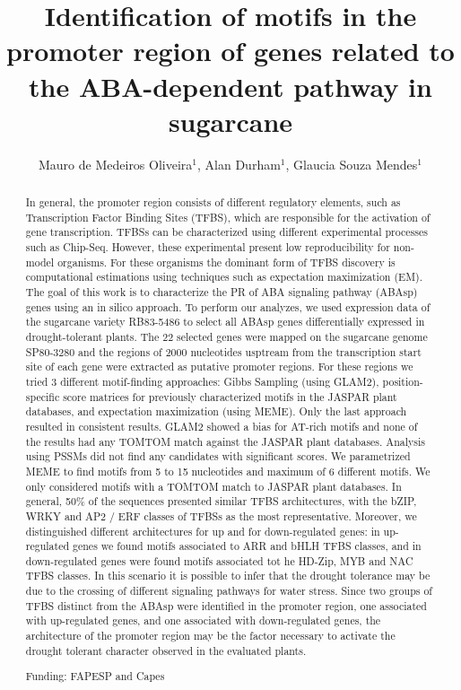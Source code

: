 \documentclass[twoside]{article}
\title{\vspace{-15mm}\fontsize{24pt}{10pt}\selectfont\textbf{Identification of motifs in the promoter region of genes related to the ABA-dependent pathway in sugarcane}} %
\author{Mauro de Medeiros Oliveira$^1$, Alan Durham$^1$, Glaucia Souza Mendes$^1$}
\affil{1 USP\\ }
\date{}
\begin{document}
\maketitle %

\thispagestyle{fancy} %


\begin{abstract}
In general, the promoter region consists of different regulatory elements, such as Transcription
Factor Binding Sites (TFBS), which are responsible for the activation of gene transcription. TFBSs
can be characterized using different experimental processes such as Chip-Seq. However, these
experimental present low reproducibility for non-model organisms. For these organisms the
dominant form of TFBS discovery is computational estimations using techniques such as
expectation maximization (EM). The goal of this work is to characterize the PR of ABA signaling
pathway (ABAsp) genes using an in silico approach. To perform our analyzes, we used expression
data of the sugarcane variety RB83-5486 to select all ABAsp genes differentially expressed in
drought-tolerant plants. The 22 selected genes were mapped on the sugarcane genome SP80-3280
and the regions of 2000 nucleotides usptream from the transcription start site of each gene were
extracted as putative promoter regions. For these regions we tried 3 different motif-finding
approaches: Gibbs Sampling (using GLAM2), position-specific score matrices for previously
characterized motifs in the JASPAR plant databases, and expectation maximization (using MEME).
Only the last approach resulted in consistent results. GLAM2 showed a bias for AT-rich motifs and
none of the results had any TOMTOM match against the JASPAR plant databases. Analysis using
PSSMs did not find any candidates with significant scores. We parametrized MEME to find motifs
from 5 to 15 nucleotides and maximum of 6 different motifs. We only considered motifs with a
TOMTOM match to JASPAR plant databases. In general, 50\% of the sequences presented similar
TFBS architectures, with the bZIP, WRKY and AP2 / ERF classes of TFBSs as the most
representative. Moreover, we distinguished different architectures for up and for down-regulated
genes: in up-regulated genes we found motifs associated to ARR and bHLH TFBS classes, and in
down-regulated genes were found motifs associated tot he HD-Zip, MYB and NAC TFBS classes.
In this scenario it is possible to infer that the drought tolerance may be due to the crossing of
different signaling pathways for water stress. Since two groups of TFBS distinct from the ABAsp
were identified in the promoter region, one associated with up-regulated genes, and one associated
with down-regulated genes, the architecture of the promoter region may be the factor necessary to
activate the drought tolerant character observed in the evaluated plants.

Funding: FAPESP and Capes
\end{abstract}
\end{document}
